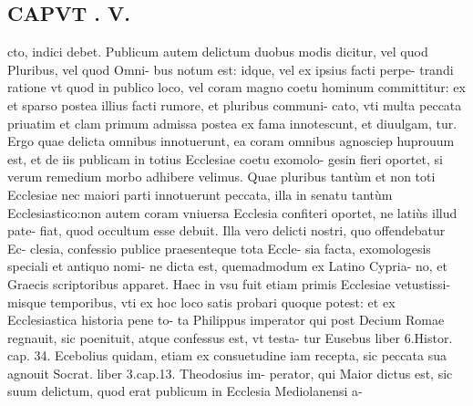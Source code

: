 \documentclass{article}
\begin{document}
\begin{pages}
\section*{CAPVT . V. }
\marginpar{[ p.524 ]}\pstart cto, indici debet. Publicum autem delictum duobus modis dicitur, vel quod Pluribus, vel quod Omni- bus notum est: idque, vel ex ipsius facti perpe- trandi ratione vt quod in publico loco, vel coram magno coetu hominum committitur: ex et sparso postea illius facti rumore, et pluribus communi- cato, vti multa peccata priuatim et clam primum admissa postea ex fama innotescunt, et diuulgam, tur. Ergo quae delicta omnibus innotuerunt, ea coram omnibus agnosciep huprouum est, et de iis publicam in totius Ecclesiae coetu exomolo- gesin fieri oportet, si verum remedium morbo adhibere velimus.  \pend\pstart Quae pluribus tantùm et non toti Ecclesiae nec maiori parti innotuerunt peccata, illa in senatu tantùm Ecclesiastico:non autem coram vniuersa Ecclesia confiteri oportet, ne latiùs illud pate- fiat, quod occultum esse debuit.  \pend\pstart Illa vero delicti nostri, quo offendebatur Ec- clesia, confessio publice praesenteque tota Eccle- sia facta, exomologesis speciali et antiquo nomi- ne dicta est, quemadmodum ex Latino Cypria- no, et Graecis scriptoribus apparet.  \pend\pstart Haec in vsu fuit etiam primis Ecclesiae vetustissi- misque  temporibus, vti ex hoc loco satis probari quoque  potest: et ex Ecclesiastica historia pene to- ta Philippus imperator qui post Decium Romae regnauit, sic poenituit, atque  confessus est, vt testa- tur Eusebus liber 6.Histor. cap. 34. Ecebolius quidam, etiam ex consuetudine iam recepta, sic peccata sua agnouit Socrat. liber 3.cap.13. Theodosius im- perator, qui Maior dictus est, sic suum delictum, quod erat publicum in Ecclesia Mediolanensi a-  \pend

\end{pages}
\end{document}

